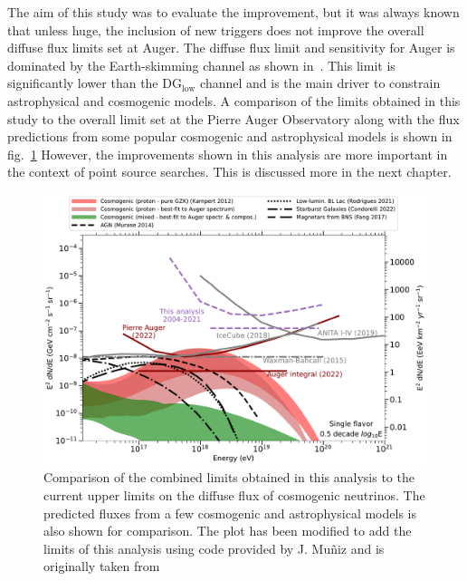 The aim of this study was to evaluate the improvement, but it was always known that unless huge, the inclusion of new triggers does not improve the overall diffuse flux limits set at Auger. The diffuse flux limit and sensitivity for Auger is dominated by the Earth-skimming channel as shown in~\cite{Aab_2019_diffuse}. This limit is significantly lower than the DG$\mathrm{_{low}}$ channel and is the main driver to constrain astrophysical and cosmogenic models. A comparison of the limits obtained in this study to the overall limit set at the Pierre Auger Observatory along with the flux predictions from some popular cosmogenic and astrophysical models is shown in fig.~\ref{fig:Limit_comp_overall} However, the improvements shown in this analysis are more important in the context of point source searches. This is discussed more in the next chapter. 

\begin{figure}[h!]
  \centering
  \includegraphics[width=14.5cm]{thesis_figures/ExpLimits/limits_and_models_DGL.pdf}
  \caption{Comparison of the combined limits obtained in this analysis to the current upper limits on the diffuse flux of cosmogenic neutrinos. The predicted fluxes from a few cosmogenic and astrophysical models is also shown for comparison. The plot has been modified to add the limits of this analysis using code provided by J. Muñiz and is originally taken from ~\cite{PierreAuger:2023pjg}}
  \label{fig:Limit_comp_overall}
\end{figure}



